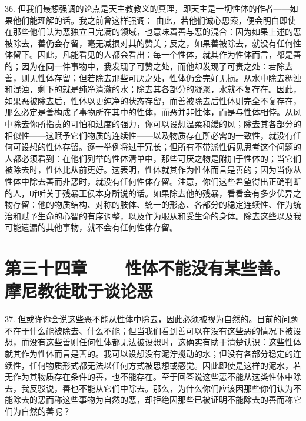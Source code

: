 36. 但我们最想强调的论点是天主教教义的真理，即天主是一切性体的作者——如果他们能理解的话。我之前曾这样强调： 由此，若他们诚心思索，便会明白即使在那些他们认为恶独立且完满的领域，也意味着善与恶的混合：因为如果上述的恶被除去，善仍会存留，毫无减损对其的赞美；反之，如果善被除去，就没有任何性体留下。因此，凡能看见的人都会看出：每一个性体，就其作为性体而言，都是善的；因为在同一件事物中，我发现了可赞之处，而他却发现了可责之处：若除去善，则无性体存留；但若除去那些可厌之处，性体仍会完好无损。从水中除去稠浊和混浊，剩下的就是纯净清澈的水；除去其各部分的凝聚，水就不复存在。因此，如果恶被除去后，性体以更纯净的状态存留，而善被除去后性体则完全不复存在，那么必定是善构成了事物所在其中的性体，而恶并非性体，而是与性体相悖。从风中除去你所指责的可怕和过度的强力，你可以设想温柔和缓的风；除去其各部分的相似性——这赋予它们物质的连续性——以及物质存在所必需的一致性，就没有任何可设想的性体存留。逐一举例将过于冗长；但所有不带派性偏见思考这个问题的人都必须看到：在他们列举的性体清单中，那些可厌之物是附加于性体的；当它们被除去时，性体比从前更好。这表明，性体就其作为性体而言是善的；因为当你从性体中除去善而非恶时，就没有任何性体存留。注意，你们这些希望得出正确判断的人，听听关于残暴王侯本身所说的话。如果除去他的残暴，看看会有多少优异之物存留：他的物质结构、对称的肢体、统一的形态、各部分的稳定连续性、作为统治和赋予生命的心智的有序调整，以及作为服从和受生命的身体。除去这些以及我可能遗漏的其他事物，就不会有任何性体存留。\par


\section{第三十四章——性体不能没有某些善。摩尼教徒耽于谈论恶}

37. 但或许你会说这些恶不能从性体中除去，因此必须被视为自然的。目前的问题不在于什么能被除去、什么不能；但当我们看到善可以在没有这些恶的情况下被设想，而没有这些善则任何性体都无法被设想时，这确实有助于清楚认识：这些性体就其作为性体而言是善的。我可以设想没有泥泞搅动的水；但没有各部分稳定的连续性，任何物质形式都无法以任何方式被思想或感觉。因此即使是这样的泥水，若无作为其物质存在条件的善，也不能存在。至于回答说这些恶不能从这类性体中除去，我反驳说，善也不能从它们中除去。那么，为什么你们应该因那些你们认为不能除去的恶而称这些事物为自然的恶，却拒绝因那些已被证明不能除去的善而称它们为自然的善呢？\par


